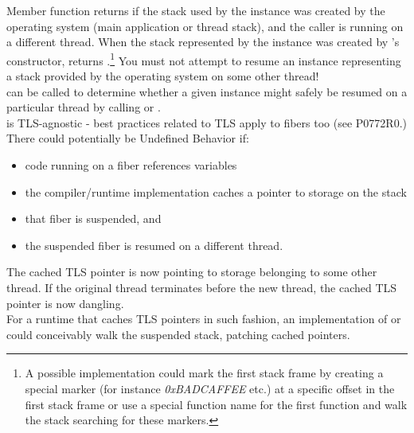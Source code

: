 
Member function \canxtresume returns  if the stack used by the
\fiber instance was created by the operating system (main application or thread
stack), and the caller is running on a different thread. When the stack
represented by the \fiber instance was created by \fiber's
constructor, \canxtresume returns .\footnote{A possible
implementation could mark the first stack frame by creating a special marker
(for instance \emph{0xBADCAFFEE} etc.) at a specific offset in the first stack
frame or use a special function name for the first function and walk the stack
searching for these markers.} You must not attempt to resume an instance
representing a stack provided by the operating system on some other thread!\\

\canresume can be called to determine whether a given \fiber instance might
safely be resumed on a particular thread by calling \resume or \resumewith.\\

\fiber is TLS-agnostic - best practices related to TLS apply to fibers too
(see P0772R0.)\\

There could potentially be Undefined Behavior if:
\begin{itemize}
    \item code running on a fiber references  variables
    \item the compiler/runtime implementation caches a pointer
          to  storage on the stack
    \item that fiber is suspended, and
    \item the suspended fiber is resumed on a different thread.
\end{itemize}

The cached TLS pointer is now pointing to storage belonging to some other
thread. If the original thread terminates before the new thread, the cached
TLS pointer is now dangling.\\

For a runtime that caches TLS pointers in such fashion, an implementation
of \xtresume or\\
\xtresumewith could conceivably walk the suspended stack,
patching cached pointers.
